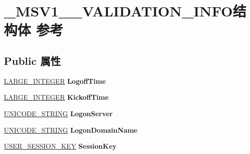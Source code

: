 \hypertarget{struct___m_s_v1__0___v_a_l_i_d_a_t_i_o_n___i_n_f_o}{}\section{\+\_\+\+M\+S\+V1\+\_\+\_\+\+V\+A\+L\+I\+D\+A\+T\+I\+O\+N\+\_\+\+I\+N\+F\+O结构体 参考}
\label{struct___m_s_v1__0___v_a_l_i_d_a_t_i_o_n___i_n_f_o}
\subsection*{Public 属性}
\begin{DoxyCompactItemize}
\item 
\mbox{\label{struct___m_s_v1__0___v_a_l_i_d_a_t_i_o_n___i_n_f_o_a4e6a2442685b99c60abfa2e17424c89a}} 
\hyperlink{union___l_a_r_g_e___i_n_t_e_g_e_r}{L\+A\+R\+G\+E\+\_\+\+I\+N\+T\+E\+G\+ER} {\bfseries Logoff\+Time}
\item 
\mbox{\label{struct___m_s_v1__0___v_a_l_i_d_a_t_i_o_n___i_n_f_o_a0bb5cdb540d959a9bd9c941207a0fc93}} 
\hyperlink{union___l_a_r_g_e___i_n_t_e_g_e_r}{L\+A\+R\+G\+E\+\_\+\+I\+N\+T\+E\+G\+ER} {\bfseries Kickoff\+Time}
\item 
\mbox{\label{struct___m_s_v1__0___v_a_l_i_d_a_t_i_o_n___i_n_f_o_a679d24dcf1e09d4d2146ce534aad00cf}} 
\hyperlink{struct___u_n_i_c_o_d_e___s_t_r_i_n_g}{U\+N\+I\+C\+O\+D\+E\+\_\+\+S\+T\+R\+I\+NG} {\bfseries Logon\+Server}
\item 
\mbox{\label{struct___m_s_v1__0___v_a_l_i_d_a_t_i_o_n___i_n_f_o_ab3784521b75608cadb04df24f0d07f68}} 
\hyperlink{struct___u_n_i_c_o_d_e___s_t_r_i_n_g}{U\+N\+I\+C\+O\+D\+E\+\_\+\+S\+T\+R\+I\+NG} {\bfseries Logon\+Domain\+Name}
\item 
\mbox{\label{struct___m_s_v1__0___v_a_l_i_d_a_t_i_o_n___i_n_f_o_a28971fc1f5ac13dbbb6e1840e908bf6c}} 
\hyperlink{struct___u_s_e_r___s_e_s_s_i_o_n___k_e_y}{U\+S\+E\+R\+\_\+\+S\+E\+S\+S\+I\+O\+N\+\_\+\+K\+EY} {\bfseries Session\+Key}

\end{DoxyCompactItemize}
